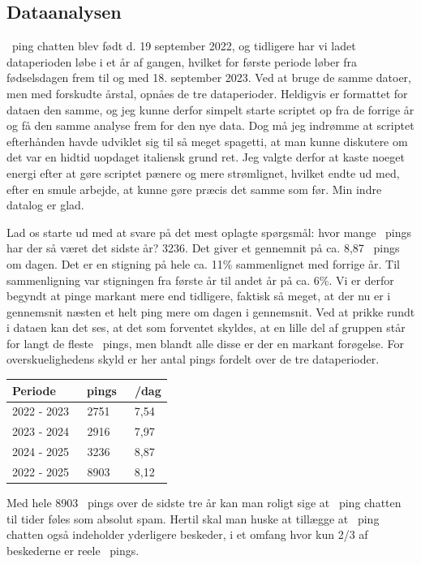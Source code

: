 \begin{article}
\subsection*{Dataanalysen}

\coffee\ ping chatten blev født d. 19 september 2022, og tidligere har vi ladet dataperioden løbe i et år af gangen, hvilket for første periode løber fra fødselsdagen frem til og med 18. september 2023. Ved at bruge de samme datoer, men med forskudte årstal, opnåes de tre dataperioder.
Heldigvis er formattet for dataen den samme, og jeg kunne derfor simpelt starte scriptet op fra de forrige år og få den samme analyse frem for den nye data. Dog må jeg indrømme at scriptet efterhånden havde udviklet sig til så meget spagetti, at man kunne diskutere om det var en hidtid uopdaget italiensk grund ret. Jeg valgte derfor at kaste noeget energi efter at gøre scriptet pænere og mere strømlignet, hvilket endte ud med, efter en smule arbejde, at kunne gøre præcis det samme som før. Min indre datalog er glad.

Lad os starte ud med at svare på det mest oplagte spørgsmål: hvor mange \coffee\ pings har der så været det sidste år? 3236. Det giver et gennemnit på ca. 8,87 \coffee\ pings om dagen. Det er en stigning på hele ca. 11\% sammenlignet med forrige år. Til sammenligning var stigningen fra første år til andet år på ca. 6\%. Vi er derfor begyndt at pinge markant mere end tidligere, faktisk så meget, at der nu er i gennemsnit næsten et helt ping mere om dagen i gennemsnit. Ved at prikke rundt i dataen kan det ses, at det som forventet skyldes, at en lille del af gruppen står for langt de fleste \coffee\ pings, men blandt alle disse er der en markant forøgelse.
For overskuelighedens skyld er her antal pings fordelt over de tre dataperioder.
\begin{center}
	\begin{tabular}{l|c|c}
		Periode & \coffee\ pings & \coffee\ \!/dag \\ \hline
		2022 - 2023 & 2751 & 7,54 \\
		2023 - 2024 & 2916 & 7,97 \\ 
    	2024 - 2025 & 3236 & 8,87 \\ \hline
		2022 - 2025 & 8903 & 8,12
	\end{tabular}
\end{center}
Med hele 8903 \coffee\ pings over de sidste tre år kan man roligt sige at \coffee\ ping chatten til tider føles som absolut spam. Hertil skal man huske at tillægge at \coffee\ ping chatten også indeholder yderligere beskeder, i et omfang hvor kun 2/3 af beskederne er reele \coffee\ pings.


\end{article}

